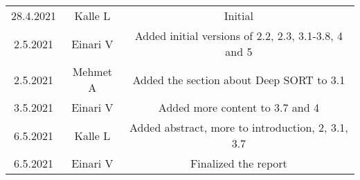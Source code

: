 \begin{center}
	\begin{tabular}{ c c c }
		28.4.2021 & Kalle L & Initial \\ 
		2.5.2021 & Einari V & Added initial versions of 2.2, 2.3, 3.1-3.8, 4 and 5 \\
		2.5.2021 & Mehmet A & Added the section about Deep SORT to 3.1 \\
		3.5.2021 & Einari V & Added more content to 3.7 and 4\\
		6.5.2021 & Kalle L & Added abstract, more to introduction, 2, 3.1, 3.7\\
		6.5.2021 & Einari V & Finalized the report\\
	\end{tabular}
\end{center}